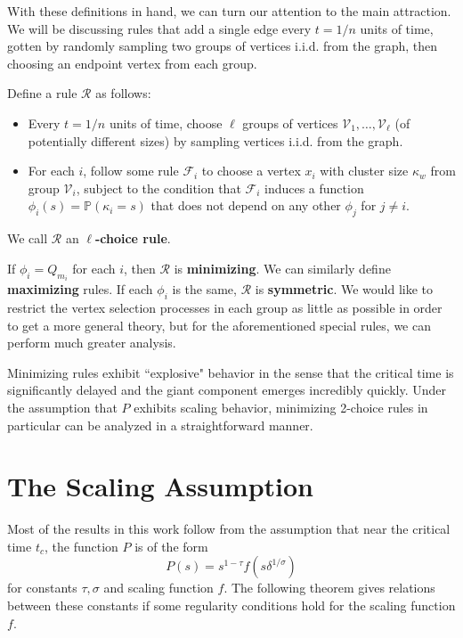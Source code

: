 \documentclass[twoside,10pt]{article}
\begin{document}
With these definitions in hand, we can turn our attention to the main attraction. We will be discussing rules that add a single edge every $t=1/n$ units of time, gotten by randomly sampling two groups of vertices i.i.d. from the graph, then choosing an endpoint vertex from each group.

\begin{defn}[]
	Define a rule $\mathcal{R}$ as follows:
	\begin{itemize}
		\item Every $t=1/n$ units of time, choose $\ell$ groups of vertices $\mathcal{V}_1, \dots, \mathcal{V}_{\ell}$ (of potentially different sizes) by sampling vertices i.i.d. from the graph.
		\item For each $i$, follow some rule $\mathcal{F}_{i}$ to choose a vertex $x_i$ with cluster size $\kappa_w$ from group $\mathcal{V}_i$, subject to the condition that $\mathcal{F}_i$ induces a function $\phi_i(s) = \mathbb{P}\left( \kappa_i=s \right) $ that does not depend on any other $\phi_j$ for $j \neq i$.
	\end{itemize}
We call $\mathcal{R}$ an \textbf{$\ell$-choice rule}.
\end{defn}

If $\phi_{i}=Q_{m_i}$ for each $i$, then $\mathcal{R}$ is \textbf{minimizing}. We can similarly define \textbf{maximizing} rules. If each $\phi_i$ is the same, $\mathcal{R}$ is \textbf{symmetric}. We would like to restrict the vertex selection processes in each group as little as possible in order to get a more general theory, but for the aforementioned special rules, we can perform much greater analysis. 

Minimizing rules exhibit ``explosive" behavior in the sense that the critical time is significantly delayed and the giant component emerges incredibly quickly. Under the assumption that $P$ exhibits scaling behavior, minimizing 2-choice rules in particular can be analyzed in a straightforward manner.

\section{The Scaling Assumption}

Most of the results in this work follow from the assumption that near the critical time $t_c$, the function $P$ is of the form
\[
	P(s) = s^{1-\tau}f(s \delta^{1/\sigma})
\] for constants $\tau,\sigma$ and scaling function $f$. The following theorem gives relations between these constants if some regularity conditions hold for the scaling function $f$.
\end{document}
